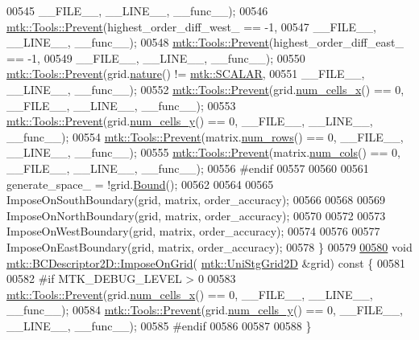 \begin{DoxyCode}
00545                       \_\_FILE\_\_, \_\_LINE\_\_, \_\_func\_\_);
00546   \hyperlink{classmtk_1_1Tools_a332324c6f25e66be9dff48c5987a3b9f}{mtk::Tools::Prevent}(highest\_order\_diff\_west\_ == -1,
00547                       \_\_FILE\_\_, \_\_LINE\_\_, \_\_func\_\_);
00548   \hyperlink{classmtk_1_1Tools_a332324c6f25e66be9dff48c5987a3b9f}{mtk::Tools::Prevent}(highest\_order\_diff\_east\_ == -1,
00549                       \_\_FILE\_\_, \_\_LINE\_\_, \_\_func\_\_);
00550   \hyperlink{classmtk_1_1Tools_a332324c6f25e66be9dff48c5987a3b9f}{mtk::Tools::Prevent}(grid.\hyperlink{classmtk_1_1UniStgGrid2D_a99a3a9cdb05b7306be99bde935509e30}{nature}() != \hyperlink{namespacemtk_ga4c54f2a329cfb4e56213b02a259d19e2af481d45bd70d41381c7d72e200889205}{mtk::SCALAR},
00551                       \_\_FILE\_\_, \_\_LINE\_\_, \_\_func\_\_);
00552   \hyperlink{classmtk_1_1Tools_a332324c6f25e66be9dff48c5987a3b9f}{mtk::Tools::Prevent}(grid.\hyperlink{classmtk_1_1UniStgGrid2D_a2d182866a398aba8e4829590e85bf939}{num\_cells\_x}() == 0, \_\_FILE\_\_, \_\_LINE\_\_, \_\_func\_\_);
00553   \hyperlink{classmtk_1_1Tools_a332324c6f25e66be9dff48c5987a3b9f}{mtk::Tools::Prevent}(grid.\hyperlink{classmtk_1_1UniStgGrid2D_aed05a801cc9a76dba0ff203cea58a61a}{num\_cells\_y}() == 0, \_\_FILE\_\_, \_\_LINE\_\_, \_\_func\_\_);
00554   \hyperlink{classmtk_1_1Tools_a332324c6f25e66be9dff48c5987a3b9f}{mtk::Tools::Prevent}(matrix.\hyperlink{classmtk_1_1DenseMatrix_a53f3afb3b6a8d21854458aaa9663cc74}{num\_rows}() == 0, \_\_FILE\_\_, \_\_LINE\_\_, \_\_func\_\_);
00555   \hyperlink{classmtk_1_1Tools_a332324c6f25e66be9dff48c5987a3b9f}{mtk::Tools::Prevent}(matrix.\hyperlink{classmtk_1_1DenseMatrix_a41747502d468c6728a4be31501b16e0e}{num\_cols}() == 0, \_\_FILE\_\_, \_\_LINE\_\_, \_\_func\_\_);
00556 \textcolor{preprocessor}{  #endif}
00557 
00560 
00561   generate\_space\_ = !grid.\hyperlink{classmtk_1_1UniStgGrid2D_aa651194ccd0321a7c61a8f56fa5e8455}{Bound}();
00562 
00564 
00565   ImposeOnSouthBoundary(grid, matrix, order\_accuracy);
00566 
00568 
00569   ImposeOnNorthBoundary(grid, matrix, order\_accuracy);
00570 
00572 
00573   ImposeOnWestBoundary(grid, matrix, order\_accuracy);
00574 
00576 
00577   ImposeOnEastBoundary(grid, matrix, order\_accuracy);
00578 \}
00579 
\hypertarget{mtk__bc__descriptor__2d_8cc_source_l00580}{}\hyperlink{classmtk_1_1BCDescriptor2D_a5f0ff1fda1b5266dcd77ba2301c8ba2c}{00580} \textcolor{keywordtype}{void} \hyperlink{classmtk_1_1BCDescriptor2D_a5f0ff1fda1b5266dcd77ba2301c8ba2c}{mtk::BCDescriptor2D::ImposeOnGrid}(
      \hyperlink{classmtk_1_1UniStgGrid2D}{mtk::UniStgGrid2D} &grid)\textcolor{keyword}{ const }\{
00581 
00582 \textcolor{preprocessor}{  #if MTK\_DEBUG\_LEVEL > 0}
00583   \hyperlink{classmtk_1_1Tools_a332324c6f25e66be9dff48c5987a3b9f}{mtk::Tools::Prevent}(grid.\hyperlink{classmtk_1_1UniStgGrid2D_a2d182866a398aba8e4829590e85bf939}{num\_cells\_x}() == 0, \_\_FILE\_\_, \_\_LINE\_\_, \_\_func\_\_);
00584   \hyperlink{classmtk_1_1Tools_a332324c6f25e66be9dff48c5987a3b9f}{mtk::Tools::Prevent}(grid.\hyperlink{classmtk_1_1UniStgGrid2D_aed05a801cc9a76dba0ff203cea58a61a}{num\_cells\_y}() == 0, \_\_FILE\_\_, \_\_LINE\_\_, \_\_func\_\_);
00585 \textcolor{preprocessor}{  #endif}
00586 
00587 
00588 \}
\end{DoxyCode}
